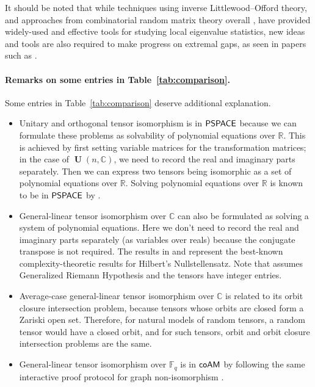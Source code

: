 \documentclass[11pt]{article}
\numberwithin{equation}{section}
\theoremstyle{remark}
\DeclareMathOperator{\Unitary}{\textbf{U}}
\newcommand{\F}{\mathbb{F}}
\newcommand{\C}{\mathbb{C}}
\newcommand{\CC}{\mathbb{C}}
\newcommand{\RR}{\mathbb{R}}
\newcommand{\ccPSPACE}{\textsf{\upshape PSPACE}}
\newcommand{\cccoAM}{\textsf{\upshape coAM}}
\begin{document}
It should be noted that while techniques using inverse Littlewood--Offord theory, and approaches from combinatorial random matrix theory overall \cite{Vu14, Vu21}, have provided widely-used and effective tools for studying local eigenvalue statistics, new ideas and tools are also required to make progress on extremal gaps, as seen in papers such as \cite{erdHos2010wegner, erdHos2015gap}.

\paragraph{Remarks on some entries in Table~\ref{tab:comparison}.} Some entries in Table~\ref{tab:comparison} deserve additional explanation.
\begin{itemize}
    \item Unitary and orthogonal tensor isomorphism is in $\ccPSPACE$ because we can formulate these problems as solvability of polynomial equations over $\RR$. This is achieved by first setting variable matrices for the transformation matrices; in the case of $\Unitary(n, \C)$, we need to record the real and imaginary parts separately. Then we can express two tensors being isomorphic as a set of polynomial equations over $\RR$. Solving polynomial equations over $\RR$ is known to be in $\ccPSPACE$ by \cite{Canny88}.
    \item General-linear tensor isomorphism over $\CC$ can also be formulated as solving a system of polynomial equations. Here we don't need to record the real and imaginary parts separately (as variables over reals) because the conjugate transpose is not required. The results in \cite{koiran1996hilbert} and \cite{AGS26} represent the best-known complexity-theoretic results for Hilbert's Nullstellensatz. Note that \cite{koiran1996hilbert} assumes Generalized Riemann Hypothesis and the tensors have integer entries. 
    \item Average-case general-linear tensor isomorphism over $\CC$ is related to its orbit closure intersection problem, because tensors whose orbits are closed form a Zariski open set. Therefore, for natural models of random tensors, a random tensor would have a closed orbit, and for such tensors, orbit and orbit closure intersection problems are the same.
    \item General-linear tensor isomorphism over $\F_q$ is in $\cccoAM$ by following the same interactive proof protocol for graph non-isomorphism \cite{GS86}. 
\end{itemize}
\end{document}
